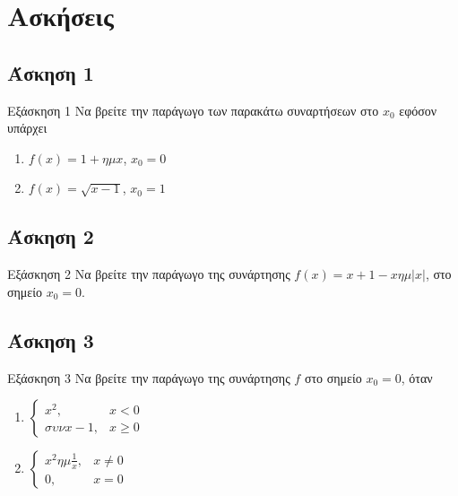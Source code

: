 \documentclass[greek]{beamer}
\begin{document}
\section{Ασκήσεις}
\subsection{Άσκηση 1}
\begin{frame}[label=Άσκηση1]{Εξάσκηση 1}
  Να βρείτε την παράγωγο των παρακάτω συναρτήσεων στο $x_0$ εφόσον υπάρχει
  \begin{enumerate}
    \item<1-> $f(x)=1+ημx$, $x_0=0$
    \item<2-> $f(x)=\sqrt{x-1}$, $x_0=1$
  \end{enumerate}

\end{frame}

\subsection{Άσκηση 2}
\begin{frame}[label=Άσκηση2]{Εξάσκηση 2}
  Να βρείτε την παράγωγο της συνάρτησης $f(x)=x+1-xημ|x|$, στο σημείο $x_0=0$.

\end{frame}

\subsection{Άσκηση 3}
\begin{frame}[label=Άσκηση3]{Εξάσκηση 3}
  Να βρείτε την παράγωγο της συνάρτησης $f$ στο σημείο $x_0=0$, όταν
  \begin{enumerate}
    \item<1-> $\begin{cases}
          x^2,    & x<0    \\
          συνx-1, & x\ge 0
        \end{cases}$
    \item<2-> $\begin{cases}
          x^2ημ\frac{1}{x}, & x\ne 0 \\
          0,                & x= 0
        \end{cases}$
  \end{enumerate}

\end{frame}
\end{document}
